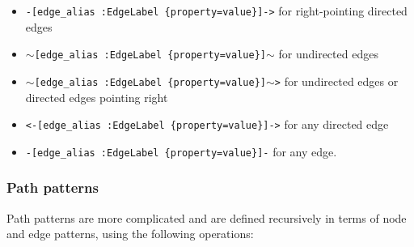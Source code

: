 \begin{itemize}
    \item \verb|-[edge_alias :EdgeLabel {property=value}]->| for right-pointing directed edges
    \item $\sim$\verb|[edge_alias :EdgeLabel {property=value}]|$\sim$ for undirected edges
    \item $\sim$\verb|[edge_alias :EdgeLabel {property=value}]|$\sim$\verb|>| for undirected edges or directed edges pointing right
    \item \verb|<-[edge_alias :EdgeLabel {property=value}]->| for any directed edge
    \item \verb|-[edge_alias :EdgeLabel {property=value}]-| for any edge.
\end{itemize}


\subsubsection{Path patterns}
Path patterns are more complicated and are defined recursively in terms of node and edge patterns, using the following operations:

